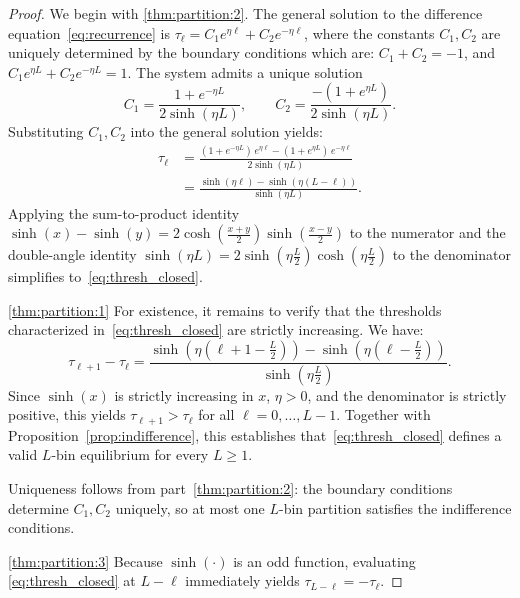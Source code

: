 \documentclass[journal,twoside,web]{ieeecolor}
\begin{document}
\begin{proof}
    We begin with \ref{thm:partition:2}. The general solution to the difference equation~\eqref{eq:recurrence} is $\tau_\ell = C_1 e^{\eta\ell} + C_2 e^{-\eta\ell}$, where the constants $C_1,C_2$ are uniquely determined by the boundary conditions which are: $C_1 + C_2 = -1$, and $C_1 e^{\eta L} + C_2 e^{-\eta L} = 1$. The system admits a unique solution
    \[
        C_1 = \frac{1 + e^{-\eta L}}{2\sinh(\eta L)},
        \qquad
        C_2 = \frac{-(1 + e^{\eta L})}{2\sinh(\eta L)}.
    \]
    Substituting $C_1,C_2$ into the general solution yields:
    \begin{align*}
        \tau_\ell \nonumber
         & = \frac{(1+e^{-\eta L})\,e^{\eta\ell}
                 - (1+e^{\eta L})\,e^{-\eta\ell}}{2\sinh(\eta L)}    \nonumber                              \\
         & = \frac{\sinh(\eta\ell) - \sinh(\eta( L-\ell))}{\sinh(\eta L)}    \label{eq:thresh_closed_step}.
    \end{align*}
    Applying the sum-to-product identity $\sinh(x) - \sinh(y) = 2\cosh(\frac{x+y}{2})\sinh(\frac{x-y}{2})$ to the numerator and the double-angle identity $\sinh(\eta L) = 2\sinh(\eta\frac{L}{2})\cosh(\eta\frac{L}{2})$ to the denominator simplifies to~\eqref{eq:thresh_closed}.

    \ref{thm:partition:1} For existence, it remains to verify that the thresholds characterized in~\eqref{eq:thresh_closed} are strictly
    increasing. We have:
    \begin{equation*}
        \label{eq:thresh_diff}
        \tau_{\ell+1} - \tau_\ell
        =
        \frac{\sinh\!\left(\eta\left(\ell+1-\frac{L}{2}\right)\right)
            - \sinh\!\left(\eta\left(\ell-\frac{L}{2}\right)\right)}
        {\sinh\!\left(\eta\frac{L}{2}\right)}.
    \end{equation*}
    Since $\sinh(x)$ is strictly increasing in $x$, $\eta>0$, and the denominator is strictly positive, this yields
    $\tau_{\ell+1} > \tau_\ell$ for all $\ell = 0,\dots, L-1$. Together with
    Proposition~\ref{prop:indifference}, this establishes that~\eqref{eq:thresh_closed} defines a
    valid $L$-bin equilibrium for every $L \geq 1$.

    Uniqueness follows from part~\ref{thm:partition:2}: the boundary
    conditions determine $C_1, C_2$ uniquely, so at most one $L$-bin partition
    satisfies the indifference conditions.

    \ref{thm:partition:3} Because $\sinh(\cdot)$ is an odd function, evaluating \eqref{eq:thresh_closed} at $L-\ell$ immediately yields $\tau_{L-\ell} = -\tau_\ell$.
\end{proof}
\end{document}

